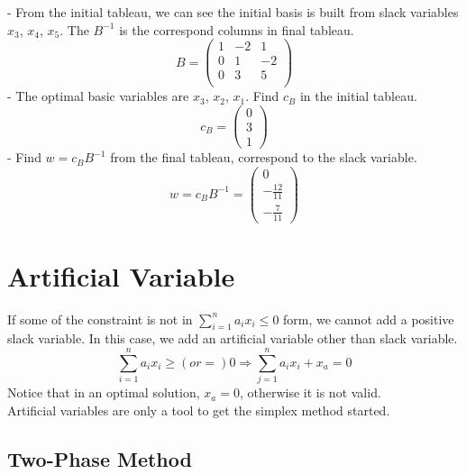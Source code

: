 				- From the initial tableau, we can see the initial basis is built from slack variables $x_3$, $x_4$, $x_5$. The $B^{-1}$ is the correspond columns in final tableau.
				\begin{equation}
					B = \left(\begin{matrix}
						1 & -2 & 1\\
						0 & 1 & -2\\
						0 & 3 & 5\\
					\end{matrix}\right) 
				\end{equation}
				- The optimal basic variables are $x_3$, $x_2$, $x_1$. Find $c_B$ in the initial tableau.
				\begin{equation}
					c_B = \left(\begin{matrix}
						0\\3\\1
					\end{matrix}\right) 
				\end{equation}
				- Find $w=c_BB^{-1}$ from the final tableau, correspond to the slack variable.
				\begin{equation}
					w = c_BB^{-1} = \left(\begin{matrix}
						0\\-\frac{12}{11}\\-\frac7{11}
					\end{matrix}\right) 
				\end{equation}

		\section{Artificial Variable}
			If some of the constraint is not in $\sum_{i=1}^na_ix_i \le 0$ form, we cannot add a positive slack variable. In this case, we add an artificial variable other than slack variable.
			\begin{equation}
				\sum_{i=1}^n a_ix_i \ge (or =) 0 \Rightarrow \sum_{j=1}^n a_ix_i + x_a = 0 
			\end{equation}
			Notice that in an optimal solution, $x_a = 0$, otherwise it is not valid.\\
			Artificial variables are only a tool to get the simplex method started.
			\subsection{Two-Phase Method}
